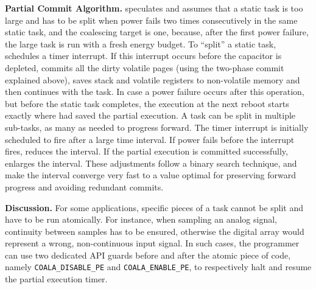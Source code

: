 \textbf{Partial Commit Algorithm.} \sys speculates and assumes that a static task is too large and has to be split when power fails two times consecutively in the same static task, and the coalescing target is one, because, after the first power failure, the large task is run with a fresh energy budget. To ``split'' a static task, \sys schedules a timer interrupt. If this interrupt occurs before the capacitor is depleted, \sys commits all the dirty volatile pages (using the two-phase commit explained above), saves stack and volatile registers to non-volatile memory and then continues with the task. In case a power failure occurs after this operation, but before the static task completes, the execution at the next reboot starts exactly where \sys had saved the partial execution. A task can be split in multiple sub-tasks, as many as needed to progress forward. The timer interrupt is initially scheduled to fire after a large time interval. If power fails before the interrupt fires, \sys reduces the interval. If the partial execution is committed successfully, \sys enlarges the interval. These adjustments follow a binary search technique, and make the interval converge very fast to a value optimal for preserving forward progress and avoiding redundant commits.

\textbf{Discussion.} For some applications, specific pieces of a task cannot be split and have to be run atomically. For instance, when sampling an analog signal, continuity between samples has to be ensured, otherwise the digital array would represent a wrong, non-continuous input signal. In such cases, the programmer can use two dedicated API guards before and after the atomic piece of code, namely \texttt{COALA\_DISABLE\_PE} and \texttt{COALA\_ENABLE\_PE}, to respectively halt and resume the partial execution timer.

